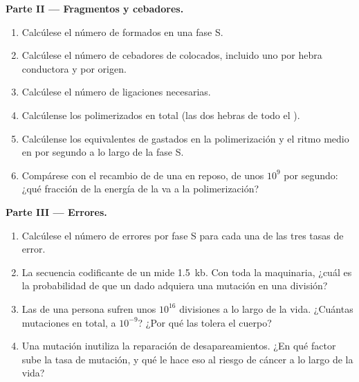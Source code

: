 \begin{problem}
\medskip
\noindent\textbf{Parte II --- Fragmentos y cebadores.}
\begin{enumerate}[resume]
  \item Calcúlese el número de  formados en una fase
        S.
  \item Calcúlese el número de cebadores de  colocados, incluido uno por
        hebra conductora y por origen.
  \item Calcúlese el número de ligaciones necesarias.
  \item Calcúlense los  polimerizados en total (las dos hebras
        de todo el ).
  \item Calcúlense los equivalentes de  gastados en la polimerización y
        el ritmo medio en  por segundo a lo largo de la fase S.
  \item Compárese con el recambio de  de una  en reposo, de unos
        $10^9$ por segundo: ¿qué fracción de la energía de la  va a
        la polimerización?
\end{enumerate}

\medskip
\noindent\textbf{Parte III --- Errores.}
\begin{enumerate}[resume]
  \item Calcúlese el número de errores por fase S para cada una de las tres
        tasas de error.
  \item La secuencia codificante de un  mide \qty{1.5}{kb}. Con toda la
        maquinaria, ¿cuál es la probabilidad de que un  dado adquiera
        una mutación en una división?
  \item Las  de una persona sufren unos $10^{16}$ divisiones a lo
        largo de la vida. ¿Cuántas mutaciones en total, a $10^{-9}$? ¿Por
        qué las tolera el cuerpo?
  \item Una mutación inutiliza la reparación de desapareamientos. ¿En qué
        factor sube la tasa de mutación, y qué le hace eso al riesgo de
        cáncer a lo largo de la vida?
\end{enumerate}


\end{problem}
